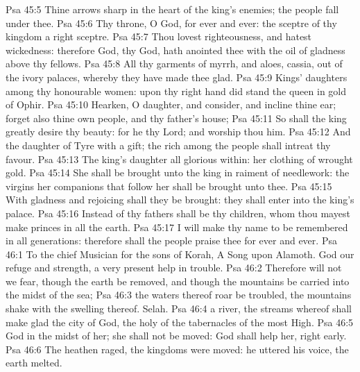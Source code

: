 \vs Psa 45:5 Thine arrows  sharp in the heart of the king's enemies;  the people fall under thee.
\vs Psa 45:6 Thy throne, O God,  for ever and ever: the sceptre of thy kingdom  a right sceptre.
\vs Psa 45:7 Thou lovest righteousness, and hatest wickedness: therefore God, thy God, hath anointed thee with the oil of gladness above thy fellows.
\vs Psa 45:8 All thy garments  of myrrh, and aloes,  cassia, out of the ivory palaces, whereby they have made thee glad.
\vs Psa 45:9 Kings' daughters  among thy honourable women: upon thy right hand did stand the queen in gold of Ophir.
\vs Psa 45:10 Hearken, O daughter, and consider, and incline thine ear; forget also thine own people, and thy father's house;
\vs Psa 45:11 So shall the king greatly desire thy beauty: for he  thy Lord; and worship thou him.
\vs Psa 45:12 And the daughter of Tyre  with a gift;  the rich among the people shall intreat thy favour.
\vs Psa 45:13 The king's daughter  all glorious within: her clothing  of wrought gold.
\vs Psa 45:14 She shall be brought unto the king in raiment of needlework: the virgins her companions that follow her shall be brought unto thee.
\vs Psa 45:15 With gladness and rejoicing shall they be brought: they shall enter into the king's palace.
\vs Psa 45:16 Instead of thy fathers shall be thy children, whom thou mayest make princes in all the earth.
\vs Psa 45:17 I will make thy name to be remembered in all generations: therefore shall the people praise thee for ever and ever.
\vs Psa 46:1 To the chief Musician for the sons of Korah, A Song upon Alamoth. God  our refuge and strength, a very present help in trouble.
\vs Psa 46:2 Therefore will not we fear, though the earth be removed, and though the mountains be carried into the midst of the sea;
\vs Psa 46:3  the waters thereof roar  be troubled,  the mountains shake with the swelling thereof. Selah.
\vs Psa 46:4  a river, the streams whereof shall make glad the city of God, the holy  of the tabernacles of the most High.
\vs Psa 46:5 God  in the midst of her; she shall not be moved: God shall help her,  right early.
\vs Psa 46:6 The heathen raged, the kingdoms were moved: he uttered his voice, the earth melted.
